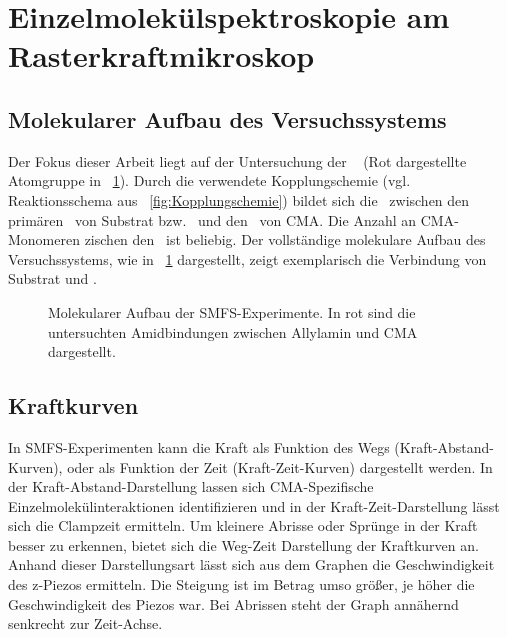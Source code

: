\section{Einzelmolekülspektroskopie am Rasterkraftmikroskop}
\label{sec:einzelmolekülspektroskopie_am_rasterkraftmikroskop}

\subsection{Molekularer Aufbau des Versuchssystems}
\label{subsec:molekularer_aufbau_des_Versuchssystems}

Der Fokus dieser Arbeit liegt auf der Untersuchung der \amid~ (Rot dargestellte Atomgruppe in \abb~\ref{fig:molekularer_aufbau}). Durch die verwendete Kopplungschemie (vgl. Reaktionsschema aus \abb~\ref{fig:Kopplungschemie}) bildet sich die \amid~zwischen den primären \aminos~von Substrat bzw. \spitze~und den \carboxys~von \ac{CMA}. Die Anzahl an \ac{CMA}-Monomeren zischen den \amide~ist beliebig. Der vollständige molekulare Aufbau des Versuchssystems, wie in \abb~\ref{fig:molekularer_aufbau} dargestellt, zeigt exemplarisch die Verbindung von Substrat und \spitze.

\begin{figure}[h]
	\centering
	\caption[Molekularer Aufbau der \acs*{SMFS}-Experimente]{Molekularer Aufbau der \acs*{SMFS}-Experimente. In rot sind die untersuchten Amidbindungen zwischen Allylamin und \acs*{CMA} dargestellt.}
	\label{fig:molekularer_aufbau}
\end{figure}

\subsection{Kraftkurven}
\label{subsec:kraftkurven}

In \ac{SMFS}-Experimenten kann die Kraft als Funktion des Wegs (Kraft-Abstand-Kurven), oder als Funktion der Zeit (Kraft-Zeit-Kurven) dargestellt werden. In der Kraft-Abstand-Darstellung lassen sich \ac{CMA}-Spezifische Einzelmolekülinteraktionen identifizieren und in der Kraft-Zeit-Darstellung lässt sich die Clampzeit ermitteln. Um kleinere Abrisse oder Sprünge in der Kraft besser zu erkennen, bietet sich die Weg-Zeit Darstellung der Kraftkurven an. Anhand dieser Darstellungsart lässt sich aus dem Graphen die Geschwindigkeit des z-Piezos ermitteln. Die Steigung ist im Betrag umso größer, je höher die Geschwindigkeit des Piezos war. Bei Abrissen steht der Graph annähernd senkrecht zur Zeit-Achse. \\

